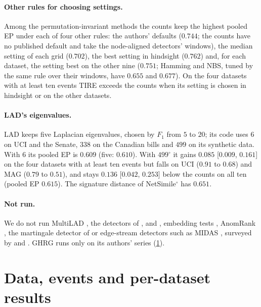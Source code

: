 \documentclass[11pt]{article}
\theoremstyle{dsplain}
\theoremstyle{definition}
\begin{document}
\paragraph{Other rules for choosing settings.} Among the permutation-invariant methods the counts keep the
highest pooled EP under each of four other rules: the authors' defaults ($0.744$; the counts have no
published default and take the node-aligned detectors' windows), the median setting of each grid ($0.702$),
the best setting in hindsight ($0.762$) and, for each dataset, the setting best on the other nine ($0.751$;
Hamming and NBS, tuned by the same rule over their windows, have $0.655$ and $0.677$). On the four datasets
with at least ten events TIRE exceeds the counts when its setting is chosen in hindsight or on the other
datasets.

\paragraph{LAD's eigenvalues.} LAD keeps five Laplacian eigenvalues, chosen by $F_1$ from $5$
to $20$; its code uses $6$ on UCI and the Senate, $338$ on the Canadian bills and $499$ on its synthetic
data. With $6$ its pooled EP is $0.609$ (five: $0.610$). With $499$$^\circ$ it gains $0.085$ [$0.009$,
$0.161$] on the four datasets with at least ten events but falls on UCI ($0.91$ to $0.68$) and MAG ($0.79$
to $0.51$), and stays $0.136$ [$0.042$, $0.253$] below the counts on all ten (pooled EP $0.615$). The
signature distance of NetSimile$^\circ$ \citep{berlingerio2012netsimile} has $0.651$.

\paragraph{Not run.} We do not run MultiLAD \citep{huang2024laplacian}, the detectors of
\citet{ide2004eigenspace}, \citet{miller2020size} and \citet{wilson2019modeling}, embedding tests
\citep{zambon2019change}, AnomRank \citep{yoon2019fast}, the martingale detector of \citet{ho2026detecting}
or edge-stream detectors such as MIDAS \citep{bhatia2020midas}, surveyed by \citet{ranshous2015anomaly} and
\citet{akoglu2015graph}. GHRG runs only on its authors' series (\cref{app:data}).

\section{Data, events and per-dataset results}
\label{app:data}
\end{document}
